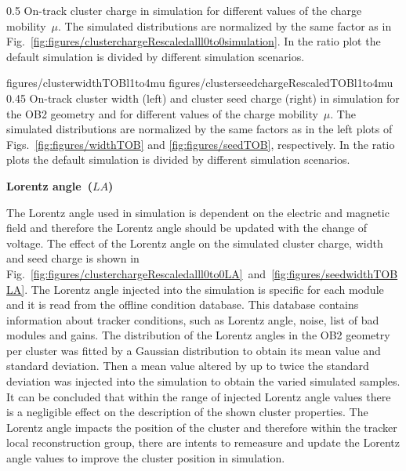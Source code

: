                  {0.5}       %
                 { On-track cluster charge in simulation for different values of the charge mobility~$\mu$.   The simulated distributions are normalized by the same factor as in Fig.~\ref{fig:figures/clusterchargeRescaledalll0to0simulation}.  In the ratio plot the default simulation is divided by different simulation scenarios. }

                 {figures/clusterwidthTOBl1to4mu}
                 {figures/clusterseedchargeRescaledTOBl1to4mu} %
                 {0.45}       %
                 { On-track cluster width (left) and cluster seed charge (right) in simulation  for the OB2 geometry and for different values of the charge mobility~$\mu$.  The simulated distributions are normalized by the same factors as in the left plots of Figs.~\ref{fig:figures/widthTOB} and \ref{fig:figures/seedTOB}, respectively.   In the ratio plots the default simulation is divided by different simulation scenarios. }

\textbf{Lorentz angle~($LA$)}

The Lorentz angle used in simulation is dependent on the electric and magnetic field and therefore the Lorentz angle should be updated with the change of voltage. The effect of the Lorentz angle on the simulated cluster charge, width and seed charge is shown in Fig.~\ref{fig:figures/clusterchargeRescaledalll0to0LA}~and~\ref{fig:figures/seedwidthTOBLA}. The Lorentz angle injected into the simulation is specific for each module and it is read from the offline condition database. This database contains information about tracker conditions, such as Lorentz angle, noise, list of bad modules and gains.  The distribution of the Lorentz angles in the OB2 geometry per cluster was fitted by  a Gaussian distribution to obtain its mean value and standard deviation. Then a mean value altered by up to twice the standard deviation was injected into the simulation to obtain the varied simulated samples. It can be concluded that within the range of injected Lorentz angle values there is a negligible effect on the description of the shown cluster properties. The Lorentz angle impacts the position of the cluster and therefore within the tracker local reconstruction group, there are intents to remeasure and update the Lorentz angle values to improve the cluster position in simulation.


